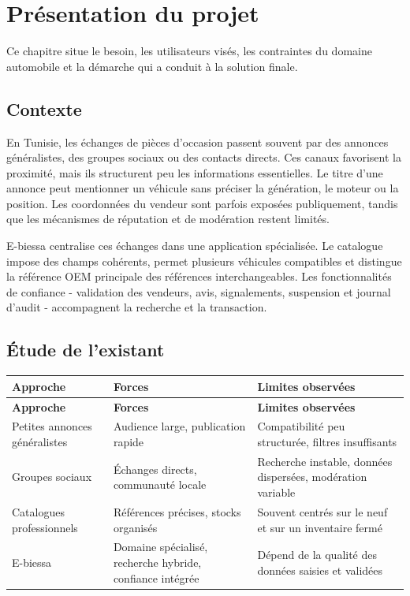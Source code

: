 \chapter{Présentation du projet}

Ce chapitre situe le besoin, les utilisateurs visés, les contraintes du domaine automobile et la démarche qui a conduit à la solution finale.


\section{Contexte}

En Tunisie, les échanges de pièces d'occasion passent souvent par des annonces généralistes, des groupes sociaux ou des contacts directs. Ces canaux favorisent la proximité, mais ils structurent peu les informations essentielles. Le titre d'une annonce peut mentionner un véhicule sans préciser la génération, le moteur ou la position. Les coordonnées du vendeur sont parfois exposées publiquement, tandis que les mécanismes de réputation et de modération restent limités.


E-biessa centralise ces échanges dans une application spécialisée. Le catalogue impose des champs cohérents, permet plusieurs véhicules compatibles et distingue la référence OEM principale des références interchangeables. Les fonctionnalités de confiance - validation des vendeurs, avis, signalements, suspension et journal d'audit - accompagnent la recherche et la transaction.


\section{Étude de l'existant}

{\small\singlespacing{}
\begin{longtable}{|>{\raggedright\arraybackslash}p{}|>{\raggedright\arraybackslash}p{}|>{\raggedright\arraybackslash}p{}|}
\hline
\rowcolor{tablehead} \color{white}\bfseries Approche & \color{white}\bfseries Forces & \color{white}\bfseries Limites observées \\ \hline
\endfirsthead
\rowcolor{tablehead} \color{white}\bfseries Approche & \color{white}\bfseries Forces & \color{white}\bfseries Limites observées \\ \hline
\endhead
\hline\endfoot
Petites annonces généralistes & Audience large, publication rapide & Compatibilité peu structurée, filtres insuffisants \\ \hline
\rowcolor{tablerow} Groupes sociaux & Échanges directs, communauté locale & Recherche instable, données dispersées, modération variable \\ \hline
Catalogues professionnels & Références précises, stocks organisés & Souvent centrés sur le neuf et sur un inventaire fermé \\ \hline
\rowcolor{tablerow} E-biessa & Domaine spécialisé, recherche hybride, confiance intégrée & Dépend de la qualité des données saisies et validées \\ \hline
\end{longtable}
}
